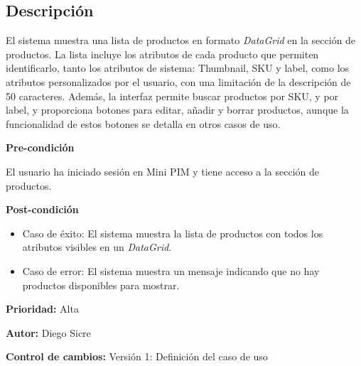 
\subsection*{Descripción}
El sistema muestra una lista de productos en formato \textit{DataGrid} en la sección de productos. La lista incluye los atributos de cada producto que permiten identificarlo, tanto los atributos de sistema: Thumbnail, SKU y label, como los atributos personalizados por el usuario, con una limitación de la descripción de 50 caracteres. Además, la interfaz permite buscar productos por SKU, y por label, y proporciona botones para editar, añadir y borrar productos, aunque la funcionalidad de estos botones se detalla en otros casos de uso.

\vspace{0.15cm}

\textbf{Pre-condición}\par
El usuario ha iniciado sesión en Mini PIM y tiene acceso a la sección de productos.\par
\vspace{0.15cm}

\textbf{Post-condición}
\begin{itemize}
    \item Caso de éxito: El sistema muestra la lista de productos con todos los atributos visibles en un \textit{DataGrid}.
    \item Caso de error: El sistema muestra un mensaje indicando que no hay productos disponibles para mostrar.
\end{itemize}

\textbf{Prioridad: }
Alta
\vspace{0.15cm}

\textbf{Autor: }
Diego Sicre\par
\vspace{0.15cm}

\textbf{Control de cambios: } Versión 1: Definición del caso de uso

